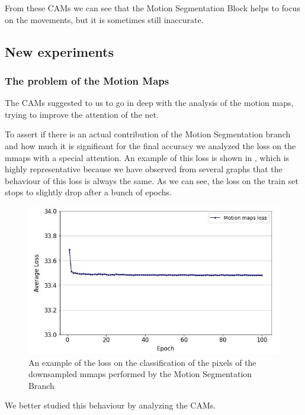 \documentclass[10pt,twocolumn,hidelinks,letterpaper]{article}
\begin{document}
From these CAMs we can see that the Motion Segmentation Block helps to focus on the movements, but it is sometimes still inaccurate.

\subsection{New experiments}

\subsubsection{The problem of the Motion Maps}

The CAMs suggested to us to go in deep with the analysis of the motion maps, trying to improve the attention of the net.

To assert if there is an actual contribution of the Motion Segmentation branch and how much it is significant for the final accuracy we analyzed the loss on the mmaps with a special attention. An example of this loss is shown in , which is highly representative because we have observed from several graphs that the behaviour of this loss is always the same. As we can see, the loss on the train set stops to slightly drop after a bunch of epochs.

\begin{figure}[t]
  \centering
  \includegraphics[width=\linewidth]{images/mmaps_loss.jpg}
  \caption{An example of the loss on the classification of the pixels of the downsampled mmaps performed by the Motion Segmentation Branch}
  \label{loss_mmaps}
\end{figure}

We better studied this behaviour by analyzing the CAMs.
\end{document}
